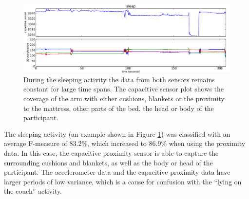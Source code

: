 \documentclass[runningheads,a4paper]{llncs}
\begin{document}
\begin{figure}[t]
	\centering
		\includegraphics[width=1.00\textwidth]{../Auswertung/images/eugen_9.pdf}
	\caption{During the sleeping activity the data from both sensors remains constant for large time spans. The capacitive sensor plot shows the coverage of the arm with either cushions, blankets or the proximity to the mattress, other parts of the bed, the head or body of the participant.}
	\label{fig:sleeping}
\end{figure}

The sleeping activity (an example shown in Figure \ref{fig:sleeping}) was classified with an average F-measure of 83.2\%, which increased to 86.9\% when using the proximity data. In this case, the capacitive proximity sensor is able to capture the surrounding cushions and blankets, as well as the body or head of the participant. The accelerometer data and the capacitive proximity data have larger periods of low variance, which is a cause for confusion with the ``lying on the couch'' activity.
\end{document}
